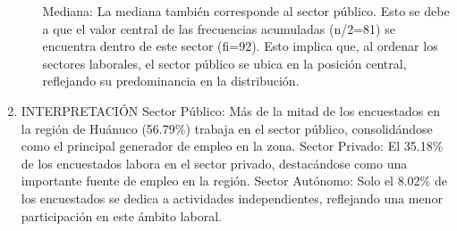 \documentclass[12pt, a4paper]{article}
\begin{document}
\begin{enumerate}
\begin{enumerate}
Mediana:
La mediana también corresponde al sector público. Esto se debe a que el valor central de las frecuencias acumuladas (n/2=81) se encuentra dentro de este sector (fi=92). Esto implica que, al ordenar los sectores laborales, el sector público se ubica en la posición central, reflejando su predominancia en la distribución.

    \end{enumerate}
    \item INTERPRETACIÓN
    Sector Público: Más de la mitad de los encuestados en la región de Huánuco (56.79\%) trabaja en el sector público, consolidándose como el principal generador de empleo en la zona.
    Sector Privado: El 35.18\% de los encuestados labora en el sector privado, destacándose como una importante fuente de empleo en la región.
    Sector Autónomo: Solo el 8.02\% de los encuestados se dedica a actividades independientes, reflejando una menor participación en este ámbito laboral.


\end{enumerate}
\end{document}
